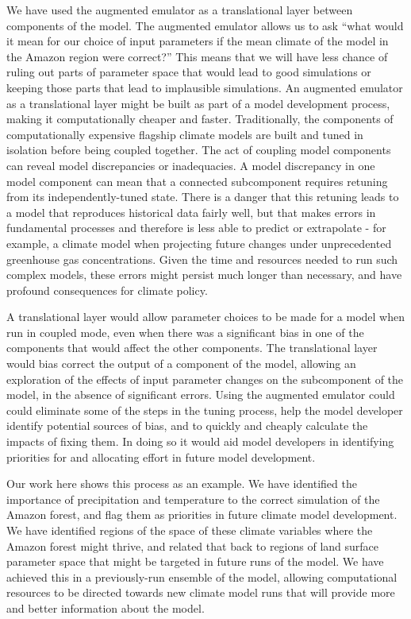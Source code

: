 \documentclass[gmd, manuscript]{copernicus}
\begin{document}
We have used the augmented emulator as a translational layer between components of the model. The augmented emulator allows us to ask ``what would it mean for our choice of input parameters if the mean climate of the model in the Amazon region were correct?'' This means that we will have less chance of ruling out parts of parameter space that would lead to good simulations or keeping those parts that lead to implausible simulations. An augmented emulator as a translational layer might be built as part of a model development process, making it computationally cheaper and faster. Traditionally, the components of computationally expensive flagship climate models are built and tuned in isolation before being coupled together. The act of coupling model components can reveal model discrepancies or inadequacies. A model discrepancy in one model component can mean that a connected subcomponent requires retuning from its independently-tuned state. There is a danger that this retuning leads to a model that reproduces historical data fairly well, but that makes errors in fundamental processes and therefore is less able to predict or extrapolate - for example, a climate model when projecting future changes under unprecedented greenhouse gas concentrations. Given the time and resources needed to run such complex models, these errors might persist much longer than necessary, and have profound consequences for climate policy. 

A translational layer would allow parameter choices to be made for a model when run in coupled mode, even when there was a significant bias in one of the components that would affect the other components. The translational layer would bias correct the output of a component of the model, allowing an exploration of the effects of input parameter changes on the subcomponent of the model, in the absence of significant errors. Using the augmented emulator could could eliminate some of the steps in the tuning process, help the model developer identify potential sources of bias, and to quickly and cheaply calculate the impacts of fixing them. In doing so it would aid model developers in identifying priorities for and allocating effort in future model development.

Our work here shows this process as an example. We have identified the importance of precipitation and temperature to the correct simulation of the Amazon forest, and flag them as priorities in future climate model development. We have identified regions of the space of these climate variables where the Amazon forest might thrive, and related that back to regions of land surface parameter space that might be targeted in future runs of the model. We have achieved this in a previously-run ensemble of the model, allowing computational resources to be directed towards new climate model runs that will provide more and better information about the model.
\end{document}

